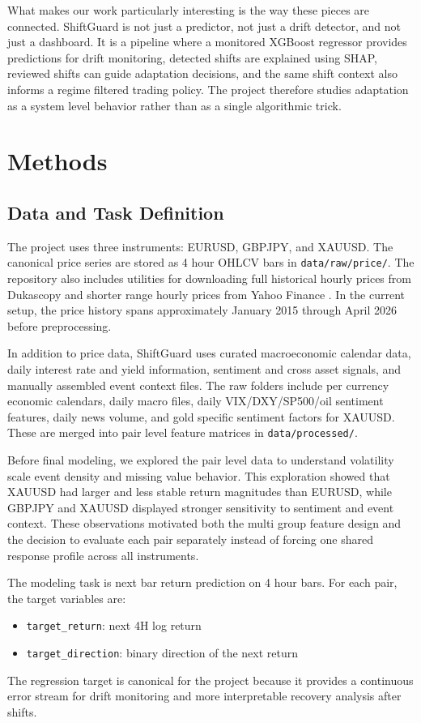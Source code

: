 \documentclass[11pt]{article}
\begin{document}
What makes our work particularly interesting is the way these pieces are connected. ShiftGuard is not just a predictor, not just a drift detector, and not just a dashboard. It is a pipeline where a monitored XGBoost regressor provides predictions for drift monitoring, detected shifts are explained using SHAP, reviewed shifts can guide adaptation decisions, and the same shift context also informs a regime filtered trading policy. The project therefore studies adaptation as a system level behavior rather than as a single algorithmic trick.

\section{Methods}
\subsection{Data and Task Definition}
The project uses three instruments: EURUSD, GBPJPY, and XAUUSD. The canonical price series are stored as 4 hour OHLCV bars in \texttt{data/raw/price/}. The repository also includes utilities for downloading full historical hourly prices from Dukascopy and shorter range hourly prices from Yahoo Finance \cite{dukascopy, yfinance}. In the current setup, the price history spans approximately January 2015 through April 2026 before preprocessing.

In addition to price data, ShiftGuard uses curated macroeconomic calendar data, daily interest rate and yield information, sentiment and cross asset signals, and manually assembled event context files. The raw folders include per currency economic calendars, daily macro files, daily VIX/DXY/SP500/oil sentiment features, daily news volume, and gold specific sentiment factors for XAUUSD. These are merged into pair level feature matrices in \texttt{data/processed/}.

Before final modeling, we explored the pair level data to understand volatility scale event density and missing value behavior. This exploration showed that XAUUSD had larger and less stable return magnitudes than EURUSD, while GBPJPY and XAUUSD displayed stronger sensitivity to sentiment and event context. These observations motivated both the multi group feature design and the decision to evaluate each pair separately instead of forcing one shared response profile across all instruments.

The modeling task is next bar return prediction on 4 hour bars. For each pair, the target variables are:
\begin{itemize}
    \item \texttt{target\_return}: next 4H log return
    \item \texttt{target\_direction}: binary direction of the next return
\end{itemize}
The regression target is canonical for the project because it provides a continuous error stream for drift monitoring and more interpretable recovery analysis after shifts.
\end{document}
